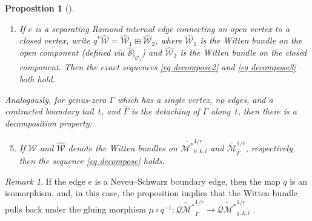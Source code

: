 \documentclass[11pt]{amsart}
\newtheorem{pr}[dummy]{Proposition}
\theoremstyle{definition}
\theoremstyle{remark}
\newtheorem{rmk}[dummy]{Remark}
\newcommand{\<}{\left<}
\renewcommand{\>}{\right>}
\numberwithin{equation}{section}
\def\Mbar{{\overline{\mathcal M}}}
\def\Mbarstar{{\overline{\mathcal M^*}}}
\begin{document}
\begin{pr}[{\cite[Proposition 2.20]{TZ1}}]
\begin{enumerate}
\item If $e$ is a separating Ramond internal edge connecting an open vertex to %
a closed vertex, write $q^*\widehat{\mathcal{W}} = \widehat{\mathcal{W}}_1 \boxplus \widehat{\mathcal{W}}_2$, where $\widehat{\mathcal{W}}_1$ is the Witten bundle on the open component (defined via $\widehat{\mathcal{S}}|_{\mathcal{C}_1}$) and $\widehat{\mathcal{W}}_2$ is the Witten bundle on the closed component.  Then the exact sequences \eqref{eq decompose2} and \eqref{eq decompose3} both hold.
\end{enumerate}
Analogously, for genus-zero $\Gamma$ which has a single vertex, no edges, and a contracted boundary tail~$t$, and $\widehat{\Gamma}$ is the detaching of $\Gamma$ along~$t$, then there is a decomposition %
property:
\begin{enumerate}
\setcounter{enumi}{4}
\item\label{it decompose cb tail} If ${\mathcal{W}}$ and $\widehat{\mathcal{W}}$ denote the Witten bundles on $\Mbarstar_{0,k,l}^{1/r}$ and $\Mbar_{\widehat\Gamma}^{1/r}$, %
respectively, then the sequence \eqref{eq decompose} holds.
\end{enumerate}
\end{pr}

\begin{rmk}\label{rmk decompose NS boundary node}
If the edge $e$ is a Neveu--Schwarz boundary edge, then the map $q$ is an %
isomorphism, and, in %
this case, the proposition implies that the Witten bundle pulls back under the gluing morphism $\mu\circ q^{-1}\colon\overline{\mathcal{QM}^*}_{\widehat\Gamma}^{1/r} \to \overline{\mathcal{QM}^*}_{g,k,l}^{1/r}$%
.

\end{rmk}
\end{document}
